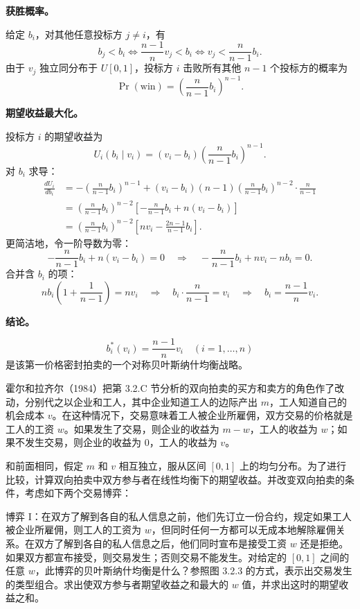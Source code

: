 \textbf{获胜概率。}

给定 $b_i$，对其他任意投标方 $j\ne i$，有
\[
	b_j<b_i
	\iff
	\frac{n-1}{n}v_j<b_i
	\iff
	v_j<\frac{n}{n-1}b_i.
\]\indent
由于 $v_j$ 独立同分布于 $U[0,1]$，投标方 $i$ 击败所有其他 $n-1$ 个投标方的概率为
\[
	\Pr(\text{win})=\left(\frac{n}{n-1}b_i\right)^{\!n-1}.
\]

\textbf{期望收益最大化。}

投标方 $i$ 的期望收益为
\[
	U_i(b_i\mid v_i)=(v_i-b_i)\left(\frac{n}{n-1}b_i\right)^{\!n-1}.
\]\indent
对 $b_i$ 求导：
\[
\begin{aligned}
	\frac{dU_i}{db_i}
	&=-\left(\frac{n}{n-1}b_i\right)^{\!n-1}
	+(v_i-b_i)(n-1)\left(\frac{n}{n-1}b_i\right)^{\!n-2}\cdot\frac{n}{n-1}\\[4pt]
	&=\left(\frac{n}{n-1}b_i\right)^{\!n-2}
	\left[-\frac{n}{n-1}b_i+n(v_i-b_i)\right]\\[4pt]
	&=\left(\frac{n}{n-1}b_i\right)^{\!n-2}
	\left[nv_i-\frac{2n-1}{n-1}b_i\right].
\end{aligned}
\]\indent
更简洁地，令一阶导数为零：
\[
	-\frac{n}{n-1}b_i+n(v_i-b_i)=0
	\quad\Longrightarrow\quad
	-\frac{n}{n-1}b_i+nv_i-nb_i=0.
\]\indent
合并含 $b_i$ 的项：
\[
	nb_i\left(1+\frac{1}{n-1}\right)=nv_i
	\quad\Longrightarrow\quad
	b_i\cdot\frac{n}{n-1}=v_i
	\quad\Longrightarrow\quad
	b_i=\frac{n-1}{n}v_i.
\]

\textbf{结论。}

\[
	\boxed{b_i^*(v_i)=\frac{n-1}{n}v_i\quad(i=1,\dots,n)}
\]\indent
是该第一价格密封拍卖的一个对称贝叶斯纳什均衡战略。


霍尔和拉齐尔（1984）把第 3.2.C 节分析的双向拍卖的买方和卖方的角色作了改动，分别代之以企业和工人，其中企业知道工人的边际产出 $m$，工人知道自己的机会成本 $v$。在这种情况下，交易意味着工人被企业所雇佣，双方交易的价格就是工人的工资 $w$。如果发生了交易，则企业的收益为 $m-w$，工人的收益为 $w$；如果不发生交易，则企业的收益为 $0$，工人的收益为 $v$。

和前面相同，假定 $m$ 和 $v$ 相互独立，服从区间 $[0,1]$ 上的均匀分布。为了进行比较，计算双向拍卖中双方参与者在线性均衡下的期望收益。并改变双向拍卖的条件，考虑如下两个交易博弈：

博弈 I：在双方了解到各自的私人信息之前，他们先订立一份合约，规定如果工人被企业所雇佣，则工人的工资为 $w$，但同时任何一方都可以无成本地解除雇佣关系。在双方了解到各自的私人信息之后，他们同时宣布是接受工资 $w$ 还是拒绝。如果双方都宣布接受，则交易发生；否则交易不能发生。对给定的 $[0,1]$ 之间的任意 $w$，此博弈的贝叶斯纳什均衡是什么？参照图 3.2.3 的方式，表示出交易发生的类型组合。求出使双方参与者期望收益之和最大的 $w$ 值，并求出这时的期望收益之和。

